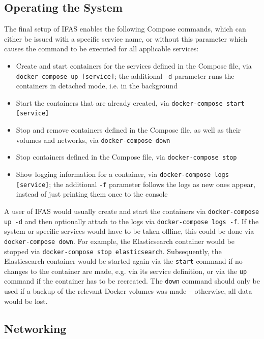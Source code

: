 \subsection{Operating the System}

The final setup of \ac{IFAS} enables the following Compose commands, which can either be issued with a specific service name, or without this parameter which causes the command to be executed for all applicable services:

\begin{itemize}
\item Create and start containers for the services defined in the Compose file, via \texttt{docker-compose up [service]}; the additional \texttt{-d} parameter runs the containers in detached mode, i.e. in the background
\item Start the containers that are already created, via \texttt{docker-compose start [service]}
\item Stop and remove containers defined in the Compose file, as well as their volumes and networks, via \texttt{docker-compose down}
\item Stop containers defined in the Compose file, via \texttt{docker-compose stop}
\item Show logging information for a container, via \texttt{docker-compose logs [service]}; the additional \texttt{-f} parameter follows the logs as new ones appear, instead of just printing them once to the  console
\end{itemize}

A user of \ac{IFAS} would usually create and start the containers via \texttt{docker-compose up -d} and then optionally attach to the logs via \texttt{docker-compose logs -f}.
If the system or specific services would have to be taken offline, this could be done via \texttt{docker-compose down}.
For example, the Elasticsearch container would be stopped via \texttt{docker-compose stop elasticsearch}.
Subsequently, the Elasticsearch container would be started again via the \texttt{start} command if no changes to the container are made, e.g. via its service definition, or via the \texttt{up} command if the container has to be recreated.
The \texttt{down} command should only be used if a backup of the relevant Docker volumes was made -- otherwise, all data would be lost.

\subsection{Networking}


